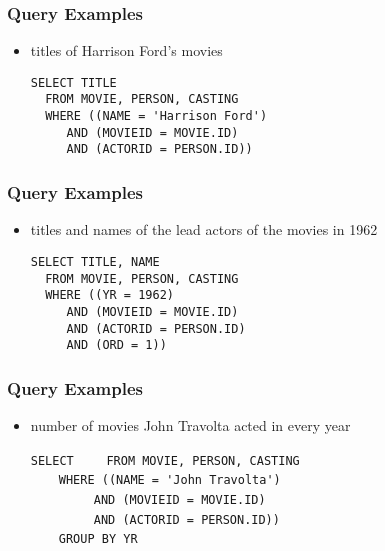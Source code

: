 \documentclass[dvipsnames]{beamer}
\theoremstyle{plain}
\begin{document}
\begin{frame}[fragile]
  \frametitle{Query Examples}

  \begin{itemize}
    \item titles of Harrison Ford's movies
    \begin{lstlisting}
SELECT TITLE
  FROM MOVIE, PERSON, CASTING
  WHERE ((NAME = 'Harrison Ford')
     AND (MOVIEID = MOVIE.ID)
     AND (ACTORID = PERSON.ID))
    \end{lstlisting}
  \end{itemize}
\end{frame}

\begin{frame}[fragile]
  \frametitle{Query Examples}

  \begin{itemize}
    \item titles and names of the lead actors of the movies in 1962
    \begin{lstlisting}
SELECT TITLE, NAME
  FROM MOVIE, PERSON, CASTING
  WHERE ((YR = 1962)
     AND (MOVIEID = MOVIE.ID)
     AND (ACTORID = PERSON.ID)
     AND (ORD = 1))
    \end{lstlisting}
  \end{itemize}
\end{frame}

\begin{frame}[fragile]
  \frametitle{Query Examples}

  \begin{itemize}
    \item number of movies John Travolta acted in every year

    \medskip
\lstinline!SELECT! 
~~~~\lstinline!FROM MOVIE, PERSON, CASTING!\\
\pause
~~~~\lstinline!WHERE ((NAME = 'John Travolta')!\\
~~~~~~~~~\lstinline!AND (MOVIEID = MOVIE.ID)!\\
~~~~~~~~~\lstinline!AND (ACTORID = PERSON.ID))!\\
\pause
~~~~\lstinline!GROUP BY YR!
  \end{itemize}
\end{frame}
\end{document}
